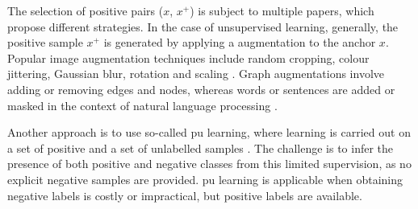 The selection of positive pairs ($x$, $x^+$) is subject to multiple papers, 
which propose different strategies.
In the case of unsupervised learning, generally, 
the positive sample $x^+$ is generated by applying a augmentation to the anchor $x$.
Popular image augmentation techniques include random cropping, colour jittering, Gaussian blur,
rotation and scaling \citet{adversarial_2020,robinson_contrastive_2021,curricular_weighting_2024}.
Graph augmentations involve adding or removing edges and nodes, 
whereas words or sentences are added or masked in the context of natural language processing 
\citet{curricular_weighting_2024}.

Another approach is to use so-called \ac{pu} learning, where learning is carried out 
on a set of positive and a set of unlabelled samples \citet{chuang_debiased_2020}.
The challenge is to infer the presence of both positive and negative classes from this limited supervision, 
as no explicit negative samples are provided. 
\ac{pu} learning is applicable when obtaining negative labels is costly or impractical, 
but positive labels are available.